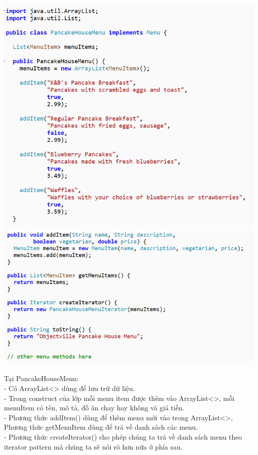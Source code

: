 	\includegraphics[width=1\columnwidth,height=0.51\textheight]{GALLEYS/images/chapter3/images3}\\
	\includegraphics[width=1\columnwidth,height=0.48\textheight]{GALLEYS/images/chapter3/images4}\\\\
Tại PancakeHouseMenu:\\
- Có ArrayList<> dùng để lưu trữ dữ liệu.\\
- Trong construct của lớp mỗi menu item được thêm vào ArrayList<>, mỗi menuItem có tên, mô tả, đồ ăn chay hay không và giá tiền.\\
- Phương thức addItem() dùng để thêm menu mới vào trong ArrayList<>,
Phương thức getMenuItem dùng để trả về danh sách các menu.\\
- Phương thức createIterator() cho phép chúng ta trả về danh sách menu theo iterator pattern mà chúng ta sẽ nói rõ hơn nữa ở phía sau.\\

